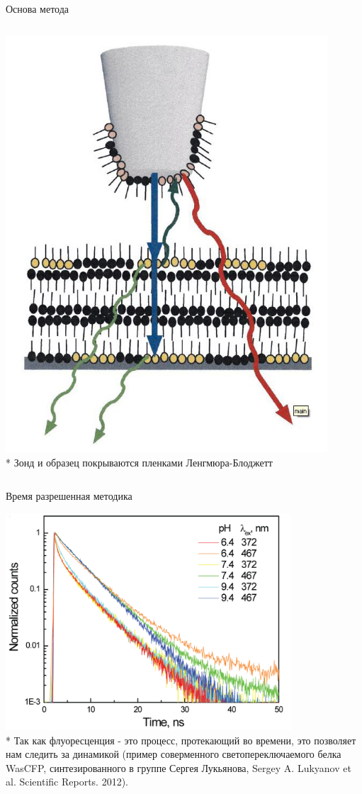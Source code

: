 \documentclass[9pt, compress, xcolor=table]{beamer}
\begin{document}
\begin{frame}{Основа метода}
\begin{columns}[c]
\column{6.5cm}
\begin{center}
\includegraphics[width=0.9\textwidth]{nfm23}
\\* Зонд и образец покрываются пленками Ленгмюра-Блоджетт
\end{center}
\end{columns}

\end{frame}

\begin{frame}{Время разрешенная методика}

\begin{center}
\includegraphics[width=0.8\textwidth]{nfm36}
\\* Так как флуоресценция - это процесс, протекающий во времени, это позволяет нам следить за динамикой (пример соверменного светопереключаемого белка WasCFP, синтезированного в группе Сергея Лукьянова, Sergey A. Lukyanov et al. Scientific Reports. 2012).
\end{center}

\end{frame}
\end{document}
